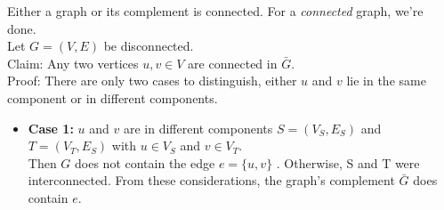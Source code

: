 \documentclass[a4paper]{article}
\begin{document}
	\newpage
	\begin{solution}{3}
		\begin{theorem}{Either a graph or its complement is connected.}
			For a \emph{connected} graph, we're done.\\
			
		
			Let $G = (V, E)$ be disconnected. \\
			Claim: Any two vertices $u,v \in V$ are connected in $\bar{G}$. \\
			Proof: There are only two cases to distinguish, either $u$ and $v$ lie in the same component or in different components. 

			\begin{itemize}
				\item  \textbf{Case 1: } $u$ and $v$ are in different components $S = (V_S, E_S)$ and $T = (V_T, E_S)$ with $u \in V_S$ and $v \in V_T$.\\
				Then $G$ does not contain the edge $e = \{u, v\}$ . Otherwise, S and T were interconnected. From these considerations, the graph's complement $\bar{G}$ does contain $e$.
				\begin{center}
				\end{center}


\end{itemize}
\end{theorem}
\end{solution}
\end{document}
